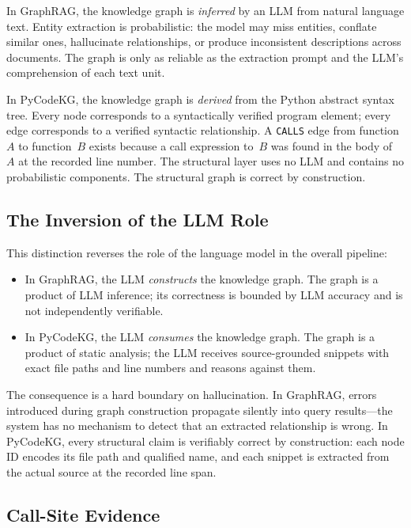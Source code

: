 \documentclass[10pt]{article}
\begin{document}
In GraphRAG, the knowledge graph is \emph{inferred} by an LLM from natural language
text. Entity extraction is probabilistic: the model may miss entities, conflate
similar ones, hallucinate relationships, or produce inconsistent descriptions across
documents. The graph is only as reliable as the extraction prompt and the LLM's
comprehension of each text unit.

In PyCodeKG, the knowledge graph is \emph{derived} from the Python abstract syntax
tree. Every node corresponds to a syntactically verified program element; every edge
corresponds to a verified syntactic relationship. A \texttt{CALLS} edge from
function~$A$ to function~$B$ exists because a call expression to~$B$ was found in
the body of~$A$ at the recorded line number. The structural layer uses no LLM and
contains no probabilistic components. The structural graph is correct by
construction.

\subsection{The Inversion of the LLM Role}

This distinction reverses the role of the language model in the overall pipeline:

\begin{itemize}
\item In GraphRAG, the LLM \emph{constructs} the knowledge graph. The graph is a
product of LLM inference; its correctness is bounded by LLM accuracy and is not
independently verifiable.
\item In PyCodeKG, the LLM \emph{consumes} the knowledge graph. The graph is a
product of static analysis; the LLM receives source-grounded snippets with exact
file paths and line numbers and reasons against them.
\end{itemize}

The consequence is a hard boundary on hallucination. In GraphRAG, errors introduced
during graph construction propagate silently into query results---the system has no
mechanism to detect that an extracted relationship is wrong. In PyCodeKG, every
structural claim is verifiably correct by construction: each node ID encodes its
file path and qualified name, and each snippet is extracted from the actual source
at the recorded line span.

\subsection{Call-Site Evidence}
\end{document}

